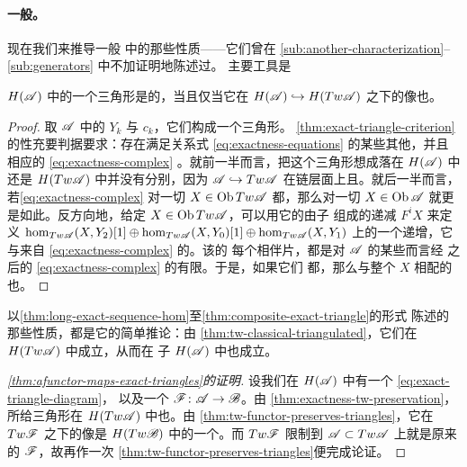 \paragraph{一般\trExactTriangle{}。}\label{sub:general-exact-triangles}
现在我们来推导一般 \trACategory{}中\trExactTriangle{}的那些性质——它们曾在
\cref{sub:another-characterization}--\cref{sub:generators} 中不加证明地陈述过。
主要工具是

\begin{lemma}\label{thm:exactness-tw-preservation}
$H(\mathscr{A})$ 中的一个三角形是\trExact{}的，当且仅当它在\trEmbedding{}%
$H(\mathscr{A})\hookrightarrow H(Tw\mathscr{A})$ 之下的像也\trExact。
\end{lemma}

\begin{proof}
取 $\mathscr{A}$ 中的\trObject{} $Y_k$ 与\trMorphism{} $c_k$，它们构成一个三角形。
\cref{thm:exact-triangle-criterion} 的\trExact{}性充要判据要求：存在满足关系式
\eqref{eq:exactness-equations} 的某些其他\trMorphism，并且相应的\trChainComplex{}
\eqref{eq:exactness-complex} \trAcyclic。就前一半而言，把这个三角形想成落在
$H(\mathscr{A})$ 中还是 $H(Tw\mathscr{A})$ 中并没有分别，因为\trEmbedding{}%
$\mathscr{A}\hookrightarrow Tw\mathscr{A}$ 在链层面上\trFull{}且\trFaithful。就后一半而言，
若\eqref{eq:exactness-complex} 对一切 $X\in\operatorname{Ob} Tw\mathscr{A}$ 都\trAcyclic，那么对一切
$X\in\operatorname{Ob}\mathscr{A}$ 就更是如此。反方向地，给定 $X\in\operatorname{Ob} Tw\mathscr{A}$，可以用它的由子%
\trComplex{}组成的递减\trFiltration{} $F^iX$ 来定义
$\hom_{Tw\mathscr{A}}(X,Y_2)[1]\oplus\hom_{Tw\mathscr{A}}(X,Y_0)[1]\oplus
\hom_{Tw\mathscr{A}}(X,Y_1)$ 上的一个递增\trFiltration，它与来自
\eqref{eq:exactness-complex} 的\trDifferential{}\trCompatible。该\trFiltration{}的
每个相伴\trGraded{}片，都是对 $\mathscr{A}$ 的某些\trObject{}而言经\trSuspension{}%
之后的\trComplex{} \eqref{eq:exactness-complex} 的有限\trDirectSum。于是，如果它们
都\trAcyclic，那么与整个 $X$ 相配的\trComplex{}也\trAcyclic。
\end{proof}

以\cref{thm:long-exact-sequence-hom}至\cref{thm:composite-exact-triangle}的形式
陈述的那些\trExactTriangle{}性质，都是它的简单推论：由
\cref{thm:tw-classical-triangulated}，它们在 $H(Tw\mathscr{A})$ 中成立，从而在%
\trFull{}子\trCategory{} $H(\mathscr{A})$ 中也成立。

\begin{proof}[\cref{thm:afunctor-maps-exact-triangles}的证明]
设我们在 $H(\mathscr{A})$ 中有一个\trExactTriangle{} \eqref{eq:exact-triangle-diagram}，
以及一个 \trAFunctor{} $\mathscr{F}\colon\mathscr{A}\to\mathscr{B}$。由
\cref{thm:exactness-tw-preservation}，所给三角形在 $H(Tw\mathscr{A})$ 中也\trExact。由
\cref{thm:tw-functor-preserves-triangles}，它在 $Tw\mathscr{F}$ 之下的像是
$H(Tw\mathscr{B})$ 中的一个\trExactTriangle。而 $Tw\mathscr{F}$ 限制到
$\mathscr{A}\subset Tw\mathscr{A}$ 上就是原来的 $\mathscr{F}$，故再作一次
\cref{thm:tw-functor-preserves-triangles}便完成论证。
\end{proof}


